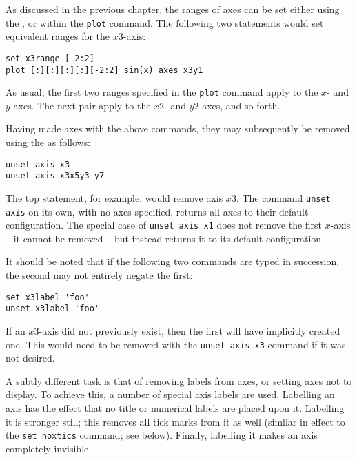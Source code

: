 As discussed in the previous chapter, the ranges of axes can be set either
using the , or within the {\tt plot} command. The following
two statements would set equivalent ranges for the $x3$-axis:

\begin{verbatim}
set x3range [-2:2]
plot [:][:][:][:][-2:2] sin(x) axes x3y1
\end{verbatim}

\noindent As usual, the first two ranges specified in the {\tt plot} command
apply to the $x$- and $y$-axes. The next pair apply to the $x2$- and $y2$-axes,
and so forth.

\label{axis_removal} Having made axes with the above commands, they may
subsequently be removed using the  as follows:

\begin{verbatim}
unset axis x3
unset axis x3x5y3 y7
\end{verbatim}

\noindent The top statement, for example, would remove axis $x3$. The command
{\tt unset axis} on its own, with no axes specified, returns all axes to
their default configuration.  The special case of {\tt unset axis x1} does
not remove the first $x$-axis -- it cannot be removed -- but instead returns it
to its default configuration.

It should be noted that if the following two commands are typed in succession,
the second may not entirely negate the first:

\begin{verbatim}
set x3label 'foo'
unset x3label 'foo'
\end{verbatim}

\noindent If an $x3$-axis did not previously exist, then the first will have
implicitly created one. This would need to be removed with the {\tt unset axis
x3} command if it was not desired.

A subtly different task is that of removing labels from axes, or setting axes
not to display. To achieve this, a number of special axis labels are used.
Labelling an axis  has the effect that no title or numerical
labels are placed upon it. Labelling it\label{nolabelstics}
 is stronger still; this removes all tick marks from it
as well (similar in effect to the {\tt set noxtics} command; see below).
Finally, labelling it  makes an axis completely invisible.

